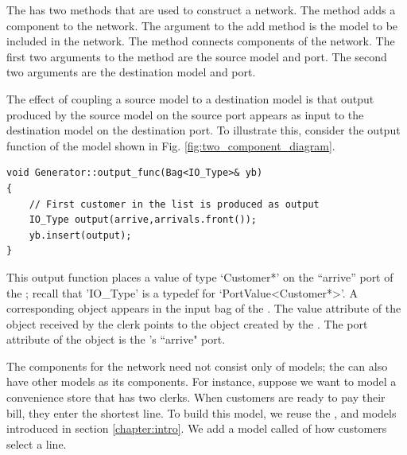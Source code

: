 The  has two methods that are used to construct a network. The  method adds a component to the network. The argument to the add method is the model to be included in the network. The  method connects components of the network. The first two arguments to the  method are the source model and port. The second two arguments are the destination model and port.

The effect of coupling a source model to a destination model is that output produced by the source model on the source port appears as input to the destination model on the destination port. To illustrate this, consider the output function of the  model shown in Fig. \ref{fig:two_component_diagram}.
\begin{verbatim}
void Generator::output_func(Bag<IO_Type>& yb)
{
    // First customer in the list is produced as output
    IO_Type output(arrive,arrivals.front());
    yb.insert(output);
}
\end{verbatim}

This output function places a value of type `Customer*' on the ``arrive'' port of the ; recall that 'IO\_Type' is a typedef for `PortValue<Customer*>'. A corresponding  object appears in the input bag of the . The value attribute of the  object received by the clerk points to the  object created by the . The port attribute of the  object is the 's ``arrive" port.

The components for the network need not consist only of  models; the  can also have other  models as its components. For instance, suppose we want to model a convenience store that has two clerks. When customers are ready to pay their bill, they enter the shortest line. To build this model, we reuse the ,  and  models introduced in section \ref{chapter:intro}. We add a model called  of how customers select a line.

